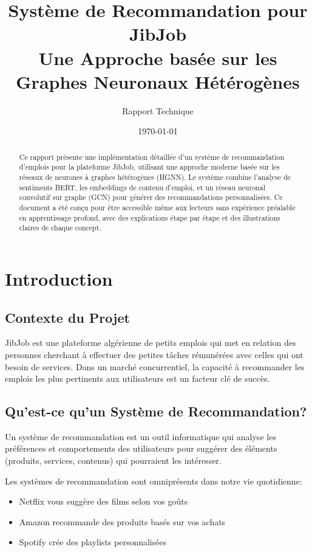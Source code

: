 \documentclass[12pt,a4paper]{article}
\title{Système de Recommandation pour JibJob\\
\large Une Approche basée sur les Graphes Neuronaux Hétérogènes}
\author{Rapport Technique}
\date{\today}
\begin{document}
\maketitle

\begin{abstract}
Ce rapport présente une implémentation détaillée d'un système de recommandation d'emplois pour la plateforme JibJob, utilisant une approche moderne basée sur les réseaux de neurones à graphes hétérogènes (HGNN). Le système combine l'analyse de sentiments BERT, les embeddings de contenu d'emploi, et un réseau neuronal convolutif sur graphe (GCN) pour générer des recommandations personnalisées. Ce document a été conçu pour être accessible même aux lecteurs sans expérience préalable en apprentissage profond, avec des explications étape par étape et des illustrations claires de chaque concept.
\end{abstract}

\tableofcontents

\section{Introduction}

\subsection{Contexte du Projet}
JibJob est une plateforme algérienne de petits emplois qui met en relation des personnes cherchant à effectuer des petites tâches rémunérées avec celles qui ont besoin de services. Dans un marché concurrentiel, la capacité à recommander les emplois les plus pertinents aux utilisateurs est un facteur clé de succès.

\subsection{Qu'est-ce qu'un Système de Recommandation?}

\begin{definitionbox}[title=Système de Recommandation]
Un système de recommandation est un outil informatique qui analyse les préférences et comportements des utilisateurs pour suggérer des éléments (produits, services, contenus) qui pourraient les intéresser.
\end{definitionbox}

Les systèmes de recommandation sont omniprésents dans notre vie quotidienne:
\begin{itemize}
    \item Netflix vous suggère des films selon vos goûts
    \item Amazon recommande des produits basés sur vos achats
    \item Spotify crée des playlists personnalisées
\end{itemize}
\end{document}
